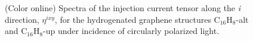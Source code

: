 \documentclass[pss]{wiley2sp} %
\begin{document}
\begin{figure}[b]
\hfill
{}
\caption{(Color online) Spectra of the injection current tensor along the
     \emph{i} direction, {$\eta^{ixy}$}, for the hydrogenated graphene structures
    C$_{16}$H$_{8}$-alt and C$_{16}$H$_{8}$-up under incidence of circularly polarized light.\label{fig:eta}}
\end{figure}
\end{document}
